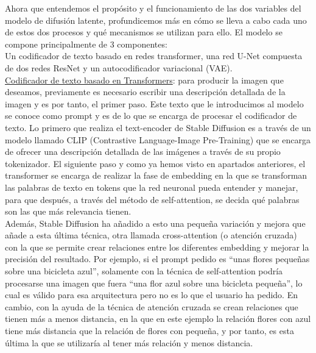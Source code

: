 Ahora que entendemos el propósito y el funcionamiento de las dos variables del modelo de difusión latente, profundicemos más en cómo se lleva a cabo cada uno de estos dos procesos y qué mecanismos se utilizan para ello. El modelo se compone principalmente de 3 componentes:\\

Un codificador de texto basado en redes transformer, una red U-Net compuesta de dos redes ResNet y un autocodificador variacional (VAE).\\

\underline{Codificador de texto basado en Transformers}: para producir la imagen que deseamos, previamente es necesario escribir una descripción detallada de la imagen y es por tanto, el primer paso. Este texto que le introducimos al modelo se conoce como prompt y es de lo que se encarga de procesar el codificador de texto.  Lo primero que realiza el text-encoder de Stable Diffusion es a través de un modelo llamado CLIP (Contrastive Language-Image Pre-Training) que se encarga de ofrecer una descripción detallada de las imágenes a través de su propio tokenizador. El siguiente paso y como ya hemos visto en apartados anteriores, el transformer se encarga de realizar la fase de embedding en la que se transforman las palabras de texto en tokens que la red neuronal pueda entender y manejar, para que después, a través del método de self-attention, se decida qué palabras son las que más relevancia tienen.\\ 
 
Además, Stable Diffusion ha añadido a esto una pequeña variación y mejora que añade a esta última técnica, otra llamada cross-attention (o atención cruzada) con la que se permite crear relaciones entre los diferentes embedding y mejorar la precisión del resultado. Por ejemplo, si el prompt pedido es “unas flores pequeñas sobre una bicicleta azul”, solamente con la técnica de self-attention podría procesarse una imagen que fuera “una flor azul sobre una bicicleta pequeña”, lo cual es válido para esa arquitectura pero no es lo que el usuario ha pedido. En cambio, con la ayuda de la técnica de atención cruzada se crean relaciones que tienen más a menos distancia, en la que en este ejemplo la relación flores con azul tiene más distancia que la relación de flores con pequeña, y por tanto, es esta última la que se utilizaría al tener más relación y menos distancia.\\

